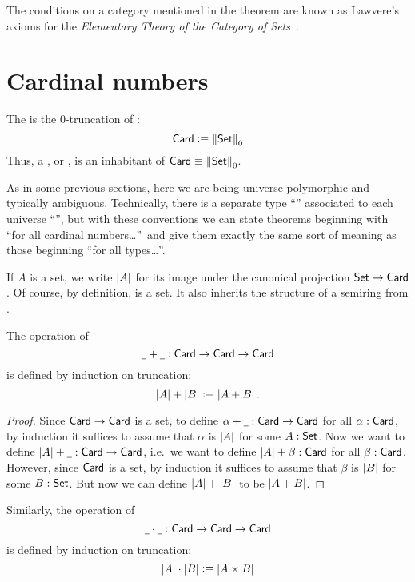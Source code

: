 \begin{rmk}
  The conditions on a category mentioned in the theorem are known as Lawvere's
  axioms for the \emph{Elementary Theory of the Category of
    Sets}~\cite{lawvere:etcs-long}.
\end{rmk}

\section{Cardinal numbers}
\label{sec:cardinals}

\begin{defn}
  The  is the 0-truncation of \set:
  \[ \mathsf{Card} \vcentcolon\equiv \left\Vert \mathsf{Set}\right\Vert_{0} \]
  Thus, a , or , is an inhabitant of $\mathsf{Card}\equiv \left\Vert \mathsf{Set}\right\Vert_{0}$.
\end{defn}

\begin{rmk}
  As in some previous sections, here we are being universe polymorphic and typically ambiguous.
  Technically, there is a separate type ``\card'' associated to each universe ``\type'', but with these conventions we can state theorems beginning with ``for all cardinal numbers\dots''\ and give them exactly the same sort of meaning as those beginning ``for all types\dots''.
\end{rmk}

If $A$ is a set, we write $\left|A\right|$ for its image under the canonical projection $\mathsf{Set} \to \mathsf{Card}$.
Of course, by definition, \card is a set.
It also inherits the structure of a semiring from \set.

\begin{defn}
  The operation of 
  \[ \mathord{\underline{\hspace{1ex}}}+\mathord{\underline{\hspace{1ex}}} : \mathsf{Card} \to \mathsf{Card} \to \mathsf{Card} \]
  is defined by induction on truncation:
  \[ \left|A\right| + \left|B\right| \vcentcolon\equiv \left|A+B\right| .\]
\end{defn}
\begin{proof}
  Since $\mathsf{Card}\to\mathsf{Card}$ is a set, to define $\alpha+\mathord{\underline{\hspace{1ex}}}:\mathsf{Card}\to\mathsf{Card}$ for all $\alpha:\mathsf{Card}$, by induction it suffices to assume that $\alpha$ is $\left|A\right|$ for some $A:\mathsf{Set}$.
  Now we want to define $\left|A\right|+\mathord{\underline{\hspace{1ex}}} :\mathsf{Card}\to\mathsf{Card}$, i.e.\ we want to define $\left|A\right|+\beta :\mathsf{Card}$ for all $\beta:\mathsf{Card}$.
  However, since $\mathsf{Card}$ is a set, by induction it suffices to assume that $\beta$ is $\left|B\right|$ for some $B:\mathsf{Set}$.
  But now we can define $\left|A\right|+\left|B\right|$ to be $\left|A+B\right|$.
\end{proof}

\begin{defn}
  Similarly, the operation of 
  \[ \mathord{\underline{\hspace{1ex}}}\cdot\mathord{\underline{\hspace{1ex}}} : \mathsf{Card} \to \mathsf{Card} \to \mathsf{Card} \]
  is defined by induction on truncation:
  \[ \left|A\right| \cdot \left|B\right| \vcentcolon\equiv \left|A\times B\right| \]
\end{defn}

